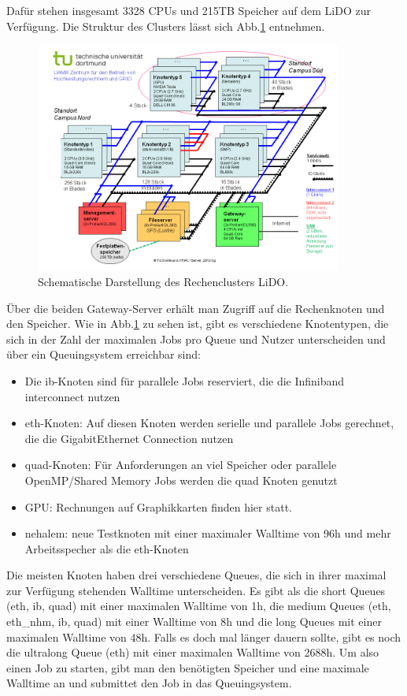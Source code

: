Dafür stehen insgesamt 3328 CPUs und 215TB Speicher auf dem LiDO zur Verfügung.
Die Struktur des Clusters lässt sich Abb.\ref{LiDo} entnehmen.

\begin{figure}[!h]
    \centering
    \includegraphics[width=0.9\textwidth]{./Plots/03_MonteCarlos/LiDO.png}
    \caption{Schematische Darstellung des Rechenclusters LiDO.}
    \label{LiDo}
\end{figure}


Über die beiden Gateway-Server erhält man Zugriff auf die Rechenknoten und den Speicher.
Wie in Abb.\ref{LiDo} zu sehen ist, gibt es verschiedene Knotentypen, die sich in der Zahl der maximalen Jobs pro Queue und Nutzer unterscheiden und über ein Queuingsystem erreichbar sind:

\begin{itemize}
 \item Die ib-Knoten sind für parallele Jobs reserviert, die die Infiniband interconnect nutzen
 \item eth-Knoten: Auf diesen Knoten werden serielle und parallele Jobs gerechnet, die die GigabitEthernet Connection nutzen
 \item quad-Knoten: Für Anforderungen an viel Speicher oder parallele OpenMP/Shared Memory Jobs werden die quad Knoten genutzt
 \item GPU: Rechnungen auf Graphikkarten finden hier statt.
 \item nehalem: neue Testknoten mit einer maximaler Walltime von 96h und mehr Arbeitsspecher als die eth-Knoten
\end{itemize}

Die meisten Knoten haben drei verschiedene Queues, die sich in ihrer maximal zur Verfügung stehenden Walltime unterscheiden.
Es gibt als die short Queues (eth, ib, quad) mit einer maximalen Walltime von 1h, die medium Queues (eth, eth\_nhm, ib, quad) mit einer Walltime von 8h und die long Queues mit einer maximalen Walltime von 48h. 
Falls es doch mal länger dauern sollte, gibt es noch die ultralong Queue (eth) mit einer maximalen Walltime von 2688h.
Um also einen Job zu starten, gibt man den benötigten Speicher und eine maximale Walltime an und submittet den Job in das Queuingsystem.


